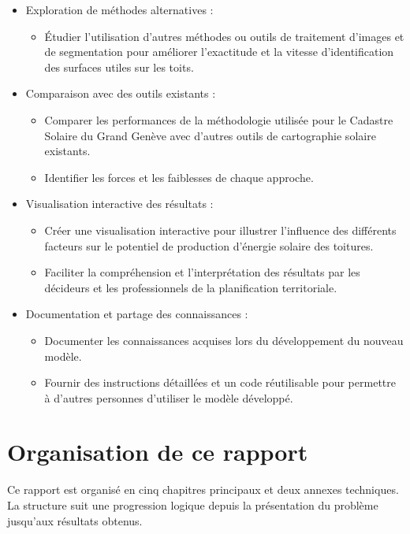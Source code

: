 \begin{itemize}
    \item Exploration de méthodes alternatives :
    \begin{itemize}
        \item Étudier l'utilisation d'autres méthodes ou outils de traitement d'images et de segmentation pour améliorer l'exactitude et la vitesse d'identification des surfaces utiles sur les toits.
    \end{itemize}

    \item Comparaison avec des outils existants :
    \begin{itemize}
        \item Comparer les performances de la méthodologie utilisée pour le Cadastre Solaire du Grand Genève avec d'autres outils de cartographie solaire existants.
        \item Identifier les forces et les faiblesses de chaque approche.
    \end{itemize}

    \item Visualisation interactive des résultats :
    \begin{itemize}
        \item Créer une visualisation interactive pour illustrer l'influence des différents facteurs sur le potentiel de production d'énergie solaire des toitures.
        \item Faciliter la compréhension et l'interprétation des résultats par les décideurs et les professionnels de la planification territoriale.
    \end{itemize}

    \item Documentation et partage des connaissances :
    \begin{itemize}
        \item Documenter les connaissances acquises lors du développement du nouveau modèle.
        \item Fournir des instructions détaillées et un code réutilisable pour permettre à d'autres personnes d'utiliser le modèle développé.
    \end{itemize}
\end{itemize}

\section{Organisation de ce rapport}
Ce rapport est organisé en cinq chapitres principaux et deux annexes techniques. La structure suit une progression logique depuis la présentation du problème jusqu'aux résultats obtenus.

